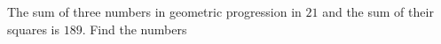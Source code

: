 
%
%
%
%
% 
% 


\question The sum of three numbers in geometric progression in $21$ and the sum of their
squares is $189$. Find the numbers

\insertQR{}

\ifprintanswers
\fi

